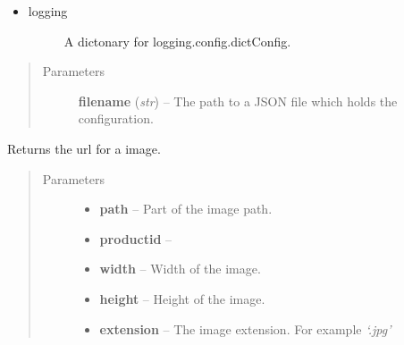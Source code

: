 \documentclass[letterpaper,10pt,english]{sphinxmanual}
\begin{document}
\begin{fulllineitems}
\begin{itemize}
\begin{description}
\end{description}

\item {} \begin{description}
\item[{logging}] \leavevmode
A dictonary for logging.config.dictConfig.

\end{description}

\end{itemize}
\begin{quote}\begin{description}
\item[{Parameters}] \leavevmode
\textbf{filename} (\emph{str}) -- The path to a JSON file which holds the configuration.

\end{description}\end{quote}

\begin{fulllineitems}
\label{collins:collins.Config.imageurl}
Returns the url for a image.
\begin{quote}\begin{description}
\item[{Parameters}] \leavevmode\begin{itemize}
\item {} 
\textbf{path} -- Part of the image path.

\item {} 
\textbf{productid} -- 

\item {} 
\textbf{width} -- Width of the image.

\item {} 
\textbf{height} -- Height of the image.

\item {} 
\textbf{extension} -- The image extension. For example \emph{`.jpg'}

\end{itemize}

\end{description}\end{quote}

\end{fulllineitems}


\end{fulllineitems}
\end{document}

